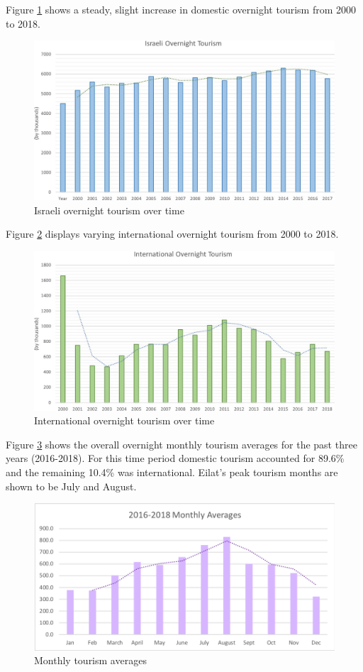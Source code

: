 \documentclass[12pt]{article}                       %
\begin{document}
Figure \ref{img:israeli_overnight_tourism} shows a steady, slight increase in domestic overnight tourism from 2000 to 2018.
\begin{figure}[H]
    \centering
    \includegraphics[width=12cm]{images/israeli_overnight_tourism.jpg}
    \caption{Israeli overnight tourism over time}
    \label{img:israeli_overnight_tourism}
\end{figure}

Figure \ref{img:international_overnight_tourism} displays varying international overnight tourism from 2000 to 2018.
\begin{figure}[H]
    \centering
    \includegraphics[width=12cm]{images/international_overnight_tourism.jpeg}
    \caption{International overnight tourism over time}
    \label{img:international_overnight_tourism}
\end{figure}

Figure \ref{img:monthly_tourism} shows the overall overnight monthly tourism averages for the past three years (2016-2018). For this time period domestic tourism accounted for 89.6\% and the remaining 10.4\% was international. Eilat's peak tourism months are shown to be July and August.

\begin{figure}[H]
    \centering
    \includegraphics[width=12cm]{images/monthy_tourism_averages.png}
    \caption{Monthly tourism averages}
    \label{img:monthly_tourism}
\end{figure}
\end{document}
